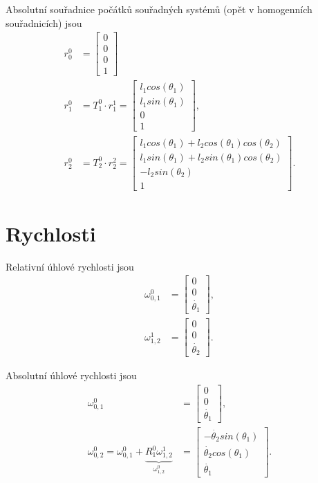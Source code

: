 \documentclass[twoside]{article}
\begin{document}
Absolutní souřadnice počátků souřadných systémů (opět v homogenních souřadnicích) jsou
\begin{equation}
	\begin{split}
		r_0^0 &= \begin{bmatrix}
			0 \\ 0 \\ 0 \\ 1
		\end{bmatrix} \\
		r_1^0 &= T_1^0 \cdot r_1^1 = \begin{bmatrix}
			l_1 cos(\theta_1) \\ l_1 sin(\theta_1) \\ 0 \\ 1
		\end{bmatrix}, \\
		r_2^0 &= T_2^0 \cdot r_2^2 = \begin{bmatrix}
			l_1 cos(\theta_1) + l_2 cos(\theta_1) cos(\theta_2) \\
			l_1 sin(\theta_1) + l_2 sin(\theta_1) cos(\theta_2) \\
			- l_2 sin(\theta_2) \\
			1
		\end{bmatrix}.
	\end{split}
\end{equation}

\section{Rychlosti}

Relativní úhlové rychlosti jsou
\begin{equation}
	\begin{split}
		\omega_{0,1}^0 &= \begin{bmatrix}
			0 \\ 0 \\ \dot{\theta_1}
		\end{bmatrix}, \\
		\omega_{1,2}^1 &= \begin{bmatrix}
			0 \\ 0 \\ \dot{\theta_2}
		\end{bmatrix}.
	\end{split}
\end{equation}

Absolutní úhlové rychlosti jsou
\begin{equation}
	\begin{split}
		\omega_{0,1}^0 &= \begin{bmatrix}
			0 \\
			 0 \\
			  \dot{\theta_1}
		\end{bmatrix}, \\
		\omega_{0,2}^0 = \omega_{0,1}^0 + \underbrace{R_1^0 \omega_{1,2}^1}_{\omega_{1,2}^0} &=  \begin{bmatrix}
			- \dot{\theta_2} sin(\theta_1) \\
			 \dot{\theta_2} cos(\theta_1) \\
			  \dot{\theta_1}
		\end{bmatrix}.
	\end{split}
\end{equation}
\end{document}

